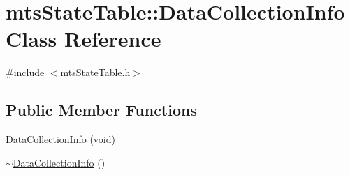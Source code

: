 \hypertarget{classmts_state_table_1_1_data_collection_info}{\section{mts\-State\-Table\-:\-:Data\-Collection\-Info Class Reference}
\label{classmts_state_table_1_1_data_collection_info}
}


{\ttfamily \#include $<$mts\-State\-Table.\-h$>$}

\subsection*{Public Member Functions}
\begin{DoxyCompactItemize}
\item 
\hyperlink{classmts_state_table_1_1_data_collection_info_a4bea45a6f77776c4fc6f6d3b20081d1f}{Data\-Collection\-Info} (void)
\item 
\hyperlink{classmts_state_table_1_1_data_collection_info_a7f10caf2d470b238ce2ca9907c2b2cee}{$\sim$\-Data\-Collection\-Info} ()
\end{DoxyCompactItemize}
